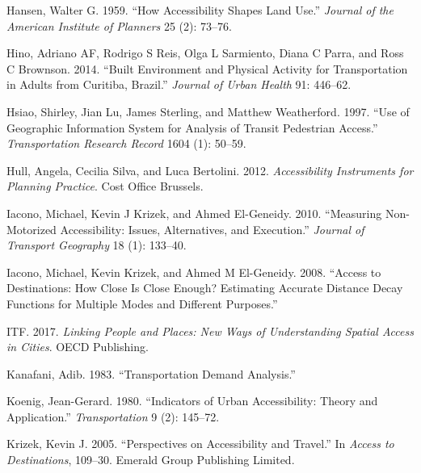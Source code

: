\documentclass[preprint, 3p,
authoryear]{elsarticle} %
\newlength{\cslhangindent}
\newlength{\cslentryspacingunit} %
\newenvironment{CSLReferences}[2] %
 {%
  \setlength{\parindent}{0pt}
  \ifodd #1
  \let\oldpar\par
  \def\par{\hangindent=\cslhangindent\oldpar}
  \fi
  \setlength{\parskip}{#2\cslentryspacingunit}
 }%
 {}
\begin{document}
\begin{CSLReferences}{1}{0}
\leavevmode{}%
Hansen, Walter G. 1959. {``How Accessibility Shapes Land Use.''}
\emph{Journal of the American Institute of Planners} 25 (2): 73--76.

\leavevmode{}%
Hino, Adriano AF, Rodrigo S Reis, Olga L Sarmiento, Diana C Parra, and
Ross C Brownson. 2014. {``Built Environment and Physical Activity for
Transportation in Adults from Curitiba, Brazil.''} \emph{Journal of
Urban Health} 91: 446--62.

\leavevmode{}%
Hsiao, Shirley, Jian Lu, James Sterling, and Matthew Weatherford. 1997.
{``Use of Geographic Information System for Analysis of Transit
Pedestrian Access.''} \emph{Transportation Research Record} 1604 (1):
50--59.

\leavevmode{}%
Hull, Angela, Cecilia Silva, and Luca Bertolini. 2012.
\emph{Accessibility Instruments for Planning Practice}. Cost Office
Brussels.

\leavevmode{}%
Iacono, Michael, Kevin J Krizek, and Ahmed El-Geneidy. 2010.
{``Measuring Non-Motorized Accessibility: Issues, Alternatives, and
Execution.''} \emph{Journal of Transport Geography} 18 (1): 133--40.

\leavevmode{}%
Iacono, Michael, Kevin Krizek, and Ahmed M El-Geneidy. 2008. {``Access
to Destinations: How Close Is Close Enough? Estimating Accurate Distance
Decay Functions for Multiple Modes and Different Purposes.''}

\leavevmode{}%
ITF. 2017. \emph{Linking People and Places: New Ways of Understanding
Spatial Access in Cities}. OECD Publishing.

\leavevmode{}%
Kanafani, Adib. 1983. {``Transportation Demand Analysis.''}

\leavevmode{}%
Koenig, Jean-Gerard. 1980. {``Indicators of Urban Accessibility: Theory
and Application.''} \emph{Transportation} 9 (2): 145--72.

\leavevmode{}%
Krizek, Kevin J. 2005. {``Perspectives on Accessibility and Travel.''}
In \emph{Access to Destinations}, 109--30. Emerald Group Publishing
Limited.


\end{CSLReferences}
\end{document}
